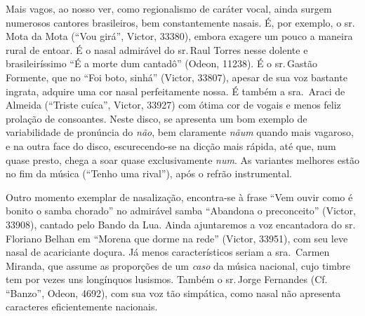 Mais vagos, ao nosso ver, como regionalismo de caráter vocal, ainda
surgem numerosos cantores brasileiros, bem constantemente nasais. É, por
exemplo, o sr.\,Mota da Mota (``Vou girá'', Victor, 33380), embora exagere um
pouco a maneira rural de entoar. É o nasal admirável do sr.\,Raul Torres
nesse dolente e brasileiríssimo ``É a morte dum cantadô'' (Odeon, 11238). É
o sr.\,Gastão Formente, que no ``Foi boto, sinhá'' (Victor, 33807), apesar de
sua voz bastante ingrata, adquire uma cor nasal perfeitamente nossa. É
também a sra.\, Araci de Almeida (``Triste cuíca'', Victor, 33927) com ótima
cor de vogais e menos feliz prolação de consoantes. Neste disco, se
apresenta um bom exemplo de variabilidade de pronúncia do \textit{não}, bem
claramente \textit{nãum} quando mais vagaroso, e na outra face do disco,
escurecendo-se na dicção mais rápida, até que, num quase presto, chega a
soar quase exclusivamente \textit{num}. As variantes melhores estão no fim da
música (``Tenho uma rival''), após o refrão instrumental.

Outro momento exemplar de nasalização, encontra-se à frase ``Vem ouvir
como é bonito o samba chorado'' no admirável samba ``Abandona o
preconceito'' (Victor, 33908), cantado pelo Bando da Lua. Ainda
ajuntaremos a voz encantadora do sr.\,Floriano Belhan em ``Morena que dorme
na rede'' (Victor, 33951), com seu leve nasal de acariciante doçura. Já
menos característicos seriam a sra.\, Carmen Miranda, que assume as
proporções de um \textit{caso} da música nacional, cujo timbre tem por vezes
uns longínquos lusismos. Também o sr.\,Jorge Fernandes (Cf. ``Banzo'',
Odeon, 4692), com sua voz tão simpática, como nasal não apresenta
caracteres eficientemente nacionais.


